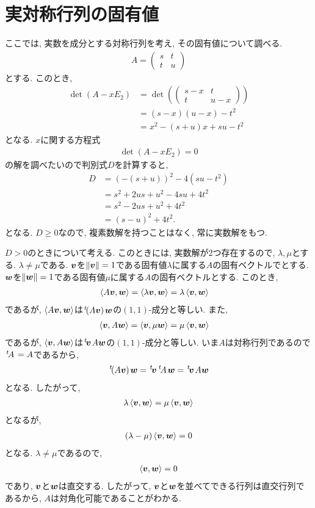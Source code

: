\section{実対称行列の固有値}

ここでは, 実数を成分とする対称行列を考え, その固有値について調べる.
\begin{align*}
  A=\begin{pmatrix}s&t\\t&u\end{pmatrix}
\end{align*}
とする.
このとき,
\begin{align*}
  \det(A-xE_2)
  &=\det(\begin{pmatrix}s-x&t\\t&u-x\end{pmatrix})\\
  &=(s-x)(u-x)-t^2\\
  &=x^2-(s+u)x+su-t^2
\end{align*}
となる. $x$に関する方程式
\begin{align*}
  \det(A-xE_2)=0
\end{align*}
の解を調べたいので判別式$D$を計算すると,
\begin{align*}
  D&=(-(s+u))^2-4(su-t^2)\\
  &=s^2+2us+u^2-4su+4t^2\\
  &=s^2-2us+u^2+4t^2\\
  &=(s-u)^2+4t^2.
\end{align*}
となる.  $D\geq 0$なので,
複素数解を持つことはなく, 常に実数解をもつ.

$D>0$のときについて考える.
このときには, 実数解が2つ存在するので,
$\lambda,\mu$とする.
$\lambda\neq\mu$である.
$\boldsymbol{v}$を$\|\boldsymbol{v}\|=1$である固有値$\lambda$に属する$A$の固有ベクトルでとする.
$\boldsymbol{w}$を$\|\boldsymbol{w}\|=1$である固有値$\mu$に属する$A$の固有ベクトルとする.
このとき,
\begin{align*}
  \Braket{A\boldsymbol{v},\boldsymbol{w}}&=\Braket{\lambda\boldsymbol{v},\boldsymbol{w}}=\lambda\Braket{\boldsymbol{v},\boldsymbol{w}}
\end{align*}
であるが, $\Braket{A\boldsymbol{v},\boldsymbol{w}}$は${\left.^{t}\!(A\boldsymbol{v})\right.}\boldsymbol{w}$の$(1,1)$-成分と等しい.
また,
\begin{align*}
  \Braket{\boldsymbol{v},A\boldsymbol{w}}&=\Braket{\boldsymbol{v},\mu\boldsymbol{w}}=\mu\Braket{\boldsymbol{v},\boldsymbol{w}}
\end{align*}
であるが, $\Braket{\boldsymbol{v},A\boldsymbol{w}}$は${\left.^{t}\!\boldsymbol{v}\right.}A\boldsymbol{w}$の$(1,1)$-成分と等しい.
いま$A$は対称行列であるので${\left.^{t}\!A\right.}=A$であるから,
\begin{align*}
  {\left.^{t}\!(A\boldsymbol{v})\right.}\boldsymbol{w}={\left.^{t}\!\boldsymbol{v}\right.}{\left.^{t}\!A\right.}\boldsymbol{w}=
  {\left.^{t}\!\boldsymbol{v}\right.}A\boldsymbol{w}
\end{align*}
となる.
したがって,
\begin{align*}
  \lambda\Braket{\boldsymbol{v},\boldsymbol{w}}=\mu\Braket{\boldsymbol{v},\boldsymbol{w}}
\end{align*}
となるが,
\begin{align*}
  (\lambda-\mu)\Braket{\boldsymbol{v},\boldsymbol{w}}=0
\end{align*}
となる. $\lambda\neq\mu$であるので,
\begin{align*}
  \Braket{\boldsymbol{v},\boldsymbol{w}}=0
\end{align*}
であり, $\boldsymbol{v}$と$\boldsymbol{w}$は直交する.
したがって, $\boldsymbol{v}$と$\boldsymbol{w}$を並べてできる行列は直交行列であるから,
$A$は対角化可能であることがわかる.



